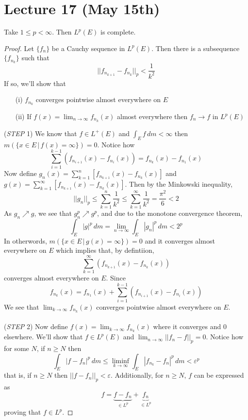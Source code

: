 \section{Lecture 17 (May 15th)}
\begin{thm}
Take $1\leq p<\infty $. Then $L^{p}(E)$ is complete.
\end{thm}
\vspace{2ex}
\begin{proof}
Let $\{f_{n}\}$ be a Cauchy sequence in $L^{p}(E)$. Then there is a subsequence $\{f_{n_{k}}\}$ such that 
\[||f_{n_{k+1}}-f_{n_{k}}||_{p}<\dfrac{1}{k^2}\]
If so, we'll show that 
\begin{itemize}
\item[(i)] $f_{n_{k}}$ converges pointwise almost everywhere on $E$
\item[(ii)] If $f(x)=\lim _{n\rightarrow \infty }f_{n_{k}}(x)$ almost everywhere then $f_{n}\rightarrow f$ in $L^{p}(E)$
\end{itemize}
\newline
({\it STEP} 1) We know that $f\in L^{+}(E)$ and $\int _{E}f\,dm<\infty $ then $m(\{x\in E \,|\, f(x)=\infty \})=0$. Notice how
\[\sum ^{k-1}_{i=1}(f_{n_{i+1}}(x)-f_{n_{i}}(x))=f_{n_{k}}(x)-f_{n_1}(x)\]
Now define $g_{n}(x)=\sum ^{n}_{k=1}[f_{n_{k+1}}(x)-f_{n_{k}}(x)]$ and $g(x)=\sum _{k=1}^{\infty }[f_{n_{k+1}}(x)-f_{n_{k}}(x)]$. Then by the Minkowski inequality, 
\[||g_{n}||_{p}\leq \sum ^{n }_{k=1}\dfrac{1}{k^2}\leq \sum ^{\infty }_{k=1}\dfrac{1}{k^2}=\dfrac{\pi ^2}{6}<2\]
As $g_{n}\nearrow g$, we see that $g_{n}^{p}\nearrow g^{p}$, and due to the monotone convergence theorem, 
\[\int _{E}|g|^{p}\,d m=\lim _{n\rightarrow \infty }\int _{E}|g_{n}|^{p}\,d m<2^{p}\]
In otherwords, $m(\{x\in E \,|\, g(x)=\infty \})=0$ and it converges almost everywhere on $E$ which implies that, by defintiion, 
\[\sum ^{\infty }_{k=1}(f_{n_{k+1}}(x)-f_{n_{k}}(x))\]
converges almost everywhere on $E$. Since 
\[f_{n_{k}}(x)=f_{n_{1}}(x)+\sum ^{k-1}_{i=1}(f_{n_{i+1}}(x)-f_{n_{i}}(x))\]
We see that $\lim _{k\rightarrow \infty }f_{n_{k}}(x)$ converges pointwise almost everywhere on $E$. 
\\\\
({\it STEP} 2) Now define $f(x)=\lim _{k\rightarrow \infty }f_{n_{k}}(x)$ where it converges and 0 elsewhere. We'll show that $f\in L^{p}(E)$ and $\lim _{n\rightarrow \infty }||f_{n}-f||_{p}=0$. Notice how for some $N$, if $n\geq N$ then 
\[\int _{E}|f-f_{n}|^{p}\,d m\leq \liminf_{k\rightarrow \infty }\int _{E}|f_{n_{k}}-f_{n}|^{p}\,d m<\varepsilon ^{p}\]
that is, if $n\geq N$ then $||f-f_{n}||_{p}<\varepsilon $. Additionally, for $n\geq N$, $f$ can be expressed as  
\[f=\underbrace{f-f_{n}}_{\in L^{p}}+\underbrace{f_{n}}_{\in L^{p}}\]
proving that $f\in L^{p}$. 
\end{proof}
